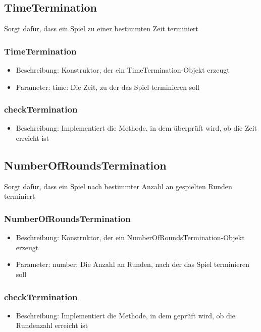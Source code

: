 \documentclass[a4paper]{scrreprt}
\begin{document}
	\subsection{TimeTermination}
	Sorgt dafür, dass ein Spiel zu einer bestimmten Zeit terminiert
	\subsubsection{TimeTermination}
	\begin{itemize}
		\item Beschreibung: Konstruktor, der ein TimeTermination-Objekt erzeugt
		\item Parameter: time: Die Zeit, zu der das Spiel terminieren soll
	\end{itemize}
	\subsubsection{checkTermination}
	\begin{itemize}
		\item Beschreibung: Implementiert die Methode, in dem überprüft wird, ob die Zeit erreicht ist
	\end{itemize}

	\subsection{NumberOfRoundsTermination}
	Sorgt dafür, dass ein Spiel nach bestimmter Anzahl an gespielten Runden terminiert
	\subsubsection{NumberOfRoundsTermination}
	\begin{itemize}
		\item Beschreibung: Konstruktor, der ein NumberOfRoundsTermination-Objekt erzeugt
		\item Parameter: number: Die Anzahl an Runden, nach der das Spiel terminieren soll
	\end{itemize}
	\subsubsection{checkTermination}
	\begin{itemize}
		\item Beschreibung: Implementiert die Methode, in dem geprüft wird, ob die Rundenzahl erreicht ist
	\end{itemize}
\end{document}
